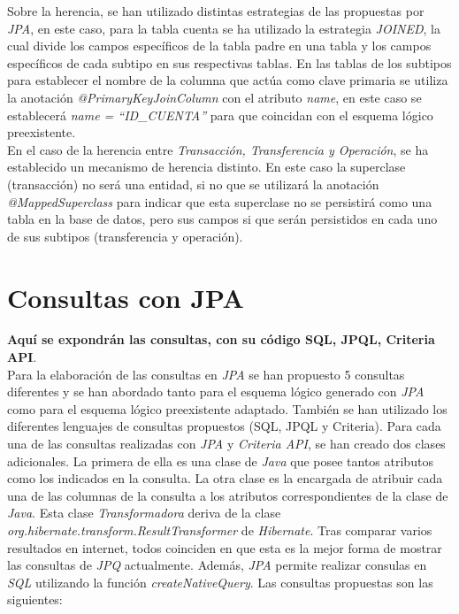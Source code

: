 \documentclass[11pt,a4paper]{article}
\begin{document}
Sobre la herencia, se han utilizado distintas estrategias de las propuestas por \emph{JPA}, en este caso, para la tabla cuenta se ha utilizado la estrategia \emph{JOINED}, la cual divide los campos específicos de la tabla padre en una tabla y los campos específicos de cada subtipo en sus respectivas tablas. En las tablas de los subtipos para establecer el nombre de la columna que actúa como clave primaria se utiliza la anotación \emph{@PrimaryKeyJoinColumn} con el atributo \emph{name}, en este caso se establecerá \emph{name = ``ID\_{}CUENTA''} para que coincidan con el esquema lógico preexistente.\\
En el caso de la herencia entre \emph{Transacción, Transferencia y Operación}, se ha establecido un mecanismo de herencia distinto. En este caso la superclase (transacción) no será una entidad, si no que se utilizará la anotación \emph{@MappedSuperclass} para indicar que esta superclase no se persistirá como una tabla en la base de datos, pero sus campos si que serán persistidos en cada uno de sus subtipos (transferencia y operación).

\newpage
\section{Consultas con JPA}

\textbf{Aquí se expondrán las consultas, con su código SQL, JPQL, Criteria API}.\\
Para la elaboración de las consultas en \emph{JPA} se han propuesto 5 consultas diferentes y se han abordado tanto para el esquema lógico generado con \emph{JPA} como para el esquema lógico preexistente adaptado. También se han utilizado los diferentes lenguajes de consultas propuestos (SQL, JPQL y Criteria). 
Para cada una de las consultas realizadas con \textit{JPA} y \textit{Criteria API}, se han creado dos clases adicionales. La primera de ella es una clase de \textit{Java} que posee tantos atributos como los indicados en la consulta. La otra clase es la encargada de atribuir cada una de las columnas de la consulta a los atributos correspondientes de la clase de \textit{Java}. Esta clase \textit{Transformadora} deriva de la clase \textit{org.hibernate.transform.ResultTransformer} de \textit{Hibernate}. Tras comparar varios resultados en internet, todos coinciden en que esta es la mejor forma de mostrar las consultas de \textit{JPQ} actualmente.
Además, \textit{JPA} permite realizar consulas en \textit{SQL} utilizando la función \textit{createNativeQuery}.
Las consultas propuestas son las siguientes:
\end{document}
